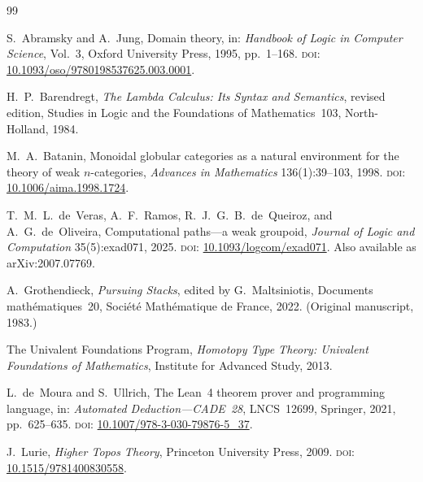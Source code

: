 \documentclass[webpdf,traditional,large,numbered]{oup-authoring-template}
\theoremstyle{thmstyleone}%
\theoremstyle{thmstyletwo}%
\theoremstyle{thmstylethree}%
\begin{document}

\begin{thebibliography}{99}

  S.~Abramsky and A.~Jung,
  Domain theory,
  in: \emph{Handbook of Logic in Computer Science}, Vol.~3,
  Oxford University Press, 1995, pp.~1--168.
  \textsc{doi}: \href{https://doi.org/10.1093/oso/9780198537625.003.0001}{10.1093/oso/9780198537625.003.0001}.

  H.~P.~Barendregt,
  \emph{The Lambda Calculus: Its Syntax and Semantics},
  revised edition,
  Studies in Logic and the Foundations of Mathematics~103,
  North-Holland, 1984.

  M.~A.~Batanin,
  Monoidal globular categories as a natural environment for the theory
  of weak $n$-categories,
  \emph{Advances in Mathematics} 136(1):39--103, 1998.
  \textsc{doi}: \href{https://doi.org/10.1006/aima.1998.1724}{10.1006/aima.1998.1724}.

  T.~M.~L.~de~Veras, A.~F.~Ramos, R.~J.~G.~B.~de~Queiroz, and
  A.~G.~de~Oliveira,
  Computational paths---a weak groupoid,
  \emph{Journal of Logic and Computation} 35(5):exad071, 2025.
  \textsc{doi}: \href{https://doi.org/10.1093/logcom/exad071}{10.1093/logcom/exad071}.
  Also available as arXiv:2007.07769.

  A.~Grothendieck,
  \emph{Pursuing Stacks},
  edited by G.~Maltsiniotis,
  Documents math\'{e}matiques~20,
  Soci\'{e}t\'{e} Math\'{e}matique de France, 2022.
  (Original manuscript, 1983.)

  The Univalent Foundations Program,
  \emph{Homotopy Type Theory: Univalent Foundations of Mathematics},
  Institute for Advanced Study, 2013.

  L.~de~Moura and S.~Ullrich,
  The Lean~4 theorem prover and programming language,
  in: \emph{Automated Deduction---CADE~28},
  LNCS~12699, Springer, 2021, pp.~625--635.
  \textsc{doi}: \href{https://doi.org/10.1007/978-3-030-79876-5_37}{10.1007/978-3-030-79876-5\_37}.

  J.~Lurie,
  \emph{Higher Topos Theory},
  Princeton University Press, 2009.
  \textsc{doi}: \href{https://doi.org/10.1515/9781400830558}{10.1515/9781400830558}.


\end{thebibliography}
\end{document}
